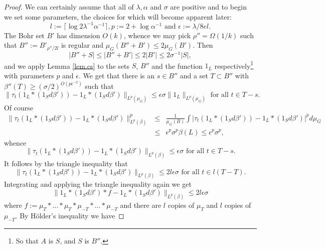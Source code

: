 \documentclass[12pt]{amsart}  %
\begin{document}
\begin{proof}
We can certainly assume that all of $\lambda,\alpha$ and $\sigma$ are positive and to begin we set some parameters, the choices for which will become apparent later:
\begin{equation*}
l:=\lceil \log 2\lambda^{-1}\alpha^{-1}\rceil, p:=2+\log\alpha^{-1} \textrm{ and } \epsilon:=\lambda/8el.
\end{equation*}
The Bohr set $B'$ has dimension $O(k)$, whence we may pick $\rho''=\Omega(1/k)$ such that $B'':=B'_{\rho''/2l}$ is regular and $\mu_G(B''+B') \leq 2\mu_G(B')$.  Then
\begin{equation*}
|B''+S| \leq |B''+B'| \leq 2|B'| \leq 2\sigma^{-1}|S|,
\end{equation*}
and we apply Lemma \ref{lem.cs} to the sets $S$, $B''$ and the function $1_L$ respectively\footnote{So that $A$ is $S$, and $S$ is $B''$.} with parameters $p$ and $\epsilon$.  We get that there is an $s \in B''$ and a set $T \subset B''$ with $\beta''(T) \geq (\sigma/2)^{O(p\epsilon^{-2})}$ such that
\begin{equation*}
\|\tau_t(1_L \ast (1_S d\beta'))-  1_L\ast (1_Sd\beta')\|_{L^{p}(\mu_G)} \leq \epsilon \sigma \|1_L\|_{L^p(\mu_G)} \textrm{ for all } t \in T-s.
\end{equation*}
Of course
\begin{eqnarray*}
\|\tau_t(1_L \ast (1_S d\beta'))-  1_L\ast (1_Sd\beta')\|_{L^{p}(\beta)}^p& \leq &\frac{1}{\mu_G(B)}\int{ |\tau_t(1_L \ast (1_S d\beta'))-  1_L\ast (1_Sd\beta')|^pd\mu_G}\\ & \leq &  \epsilon^p \sigma^p \beta(L) \leq \epsilon^p \sigma^p,
\end{eqnarray*}
whence
\begin{equation*}
\|\tau_t(1_L \ast (1_S d\beta'))-  1_L\ast (1_Sd\beta')\|_{L^{p}(\beta)} \leq \epsilon \sigma \textrm{ for all } t \in T-s.
\end{equation*}
It follows by the triangle inequality that
\begin{equation*}
\|\tau_t(1_L \ast (1_S d\beta'))-  1_L\ast (1_Sd\beta')\|_{L^{p}(\beta)} \leq 2l\epsilon \sigma \textrm{ for all } t \in l(T-T).
\end{equation*}
Integrating and applying the triangle inequality again we get
\begin{equation*}
\|1_L \ast (1_S d\beta') \ast f-  1_L\ast (1_Sd\beta')\|_{L^{p}(\beta)} \leq 2l\epsilon\sigma
\end{equation*}
where $f:=\mu_T \ast \dots \ast \mu_T \ast \mu_{-T} \ast \dots \ast \mu_{-T}$ and there are $l$ copies of $\mu_T$ and $l$ copies of $\mu_{-T}$.  By H{\"o}lder's inequality we have

\end{proof}
\end{document}
